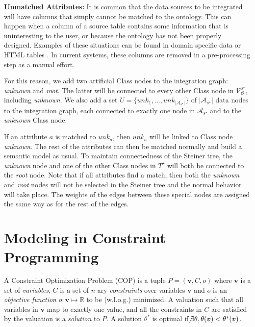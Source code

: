 \documentclass[letterpaper]{article} %
\newcommand{\authornote}[3]{
  {\fbox{\sc 
  #1}:$\blacktriangleright$\textcolor{#2}{\small{#3}}$\blacktriangleleft$}%
}
\newcommand{\ddg}[1]{\authornote{DDG}{blue}{#1}}
\begin{document}
\textbf{Unmatched Attributes:}
It is common that the data sources to be integrated will have columns that 
simply cannot be matched to the ontology.
This can happen when a column of a source table contains some information that 
is uninteresting to the user, or because the ontology has not been properly 
designed. 
Examples of these situations can be found in domain specific data 
\cite{Pham:semantic} or HTML tables \cite{Ritze:matching}.
In current systems, these columns are removed in a pre-processing step as a manual effort.

For this reason, we add two artificial Class nodes to the integration graph:  
\emph{unknown} and \emph{root}. 
The latter will be connected to every other Class node in 
$\mathcal{V}_\mathcal{O}^{s^\star}$, including \emph{unknown}.
We also add a set $U = \{unk_1,...,unk_{|\mathcal{A}_{s^\star}|}\}$ of 
$|\mathcal{A}_{s^\star}|$ data 
nodes to the integration graph, each connected to exactly one node in 
$\mathcal{A}_{s^\star}$ and to the \emph{unknown} Class node.  

If an attribute $a$ is matched to $unk_a$, then $unk_a$ will be linked to Class 
node \emph{unknown}. 
The rest of the attributes can then be matched normally 
and build  a semantic model as usual. 
To maintain connectedness of the 
Steiner tree, the \emph{unknown} node and one of the other Class nodes in $T^\star$ 
will 
both be connected to the \emph{root} node. 
Note that if all attributes find a 
match, then both the \emph{unknown} and \emph{root} nodes will not be selected in 
the Steiner tree and the normal behavior will take place.
The weights of the edges between these special nodes are
assigned the same way as for the rest of the edges.




\section{Modeling in Constraint Programming \label{SEC:CP}}

A Constraint Optimization Problem (COP) is a tuple $P=(\boldsymbol{v},C,o)$ 
where $\boldsymbol{v}$ is a 
set of \emph{variables}, $C$ is a set of $n$-ary 
\emph{constraints} over variables $\boldsymbol{v}$ and $o$ is an 
\emph{objective function} $o : \boldsymbol{v} \mapsto \mathbb{R}$ to be 
(w.l.o.g.) minimized. 
A valuation such that all variables in $\boldsymbol{v}$ map 
to exactly one value, and all the constraints in $C$ are satisfied by the 
valuation is a \emph{solution} to $P$. A solution $\theta^*$ is optimal if$\not 
\exists \theta, \theta(\boldsymbol{v}) < \theta^*(\boldsymbol{v})$.
\end{document}
